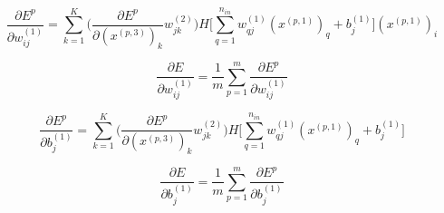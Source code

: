 \documentclass[a4paper,11pt,oneside,roman]{article}
\begin{document}
    \begin{equation}
        \frac{\partial E^p}{\partial w_{ij}^{(1)}} = \sum\limits_{k=1}^{K} \Big(\frac{\partial E^p}{\partial (x^{(p,3)})_k} w_{jk}^{(2)}\Big) H\big[\sum\limits_{q=1}^{n_{in}} w_{qj}^{(1)}(x^{(p,1)})_{q} + b_j^{(1)}\big] (x^{(p,1)})_i
    \end{equation}

    \begin{equation}
        \frac{\partial E}{\partial w_{ij}^{(1)}} = \frac{1}{m}\sum\limits_{p=1}^{m}\frac{\partial E^p}{\partial w_{ij}^{(1)}}
    \end{equation}

    \begin{equation}
        \frac{\partial E^p}{\partial b_j^{(1)}} = \sum\limits_{k=1}^{K} \Big(\frac{\partial E^p}{\partial (x^{(p,3)})_k} w_{jk}^{(2)}\Big) H\big[\sum\limits_{q=1}^{n_{in}} w_{qj}^{(1)}(x^{(p,1)})_{q} + b_j^{(1)}\big]
    \end{equation}

    \begin{equation}
        \frac{\partial E}{\partial b_j^{(1)}} = \frac{1}{m}\sum\limits_{p=1}^{m}\frac{\partial E^p}{\partial b_j^{(1)}}
    \end{equation}
\end{document}
